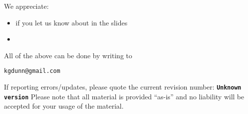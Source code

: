 \documentclass[handout,11pt,aspectratio=169,mathserif]{beamer}
\newcommand{\hgversion}{Unknown version}
\begin{document}
\begin{frame}\frametitle{}
	We appreciate:
	\begin{itemize}
		\item	if you let us know about {} in the slides
		\item	{}
	\end{itemize}
	
	\vskip24pt
	
	\begin{exampleblock}{}
		All of the above can be done by writing to
		\begin{center}
			{\Large \tt kgdunn@gmail.com}
		\end{center}
		
	\end{exampleblock}
	\vskip12pt
	{\scriptsize If reporting errors/updates, please quote the current revision number: \textbf{\tt \hgversion}}
	\vskip24pt
	Please note that all material is provided ``as-is'' and no liability will be accepted for your usage of the material.
\end{frame}


\end{document}
